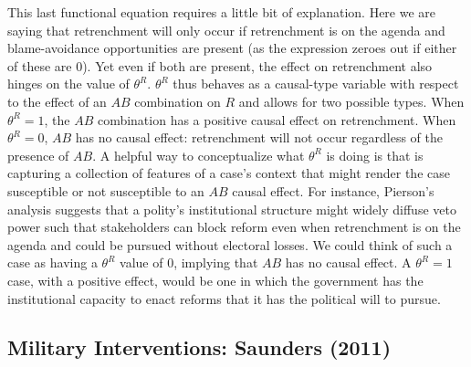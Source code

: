 \documentclass[
  12pt,
]{book}
\begin{document}
This last functional equation requires a little bit of explanation. Here we are saying that retrenchment will only occur if retrenchment is on the agenda and blame-avoidance opportunities are present (as the expression zeroes out if either of these are 0). Yet even if both are present, the effect on retrenchment also hinges on the value of \(\theta^R\). \(\theta^R\) thus behaves as a causal-type variable with respect to the effect of an \(AB\) combination on \(R\) and allows for two possible types. When \(\theta^R=1\), the \(AB\) combination has a positive causal effect on retrenchment. When \(\theta^R=0\), \(AB\) has no causal effect: retrenchment will not occur regardless of the presence of \(AB\). A helpful way to conceptualize what \(\theta^R\) is doing is that is capturing a collection of features of a case's context that might render the case susceptible or not susceptible to an \(AB\) causal effect. For instance, Pierson's analysis suggests that a polity's institutional structure might widely diffuse veto power such that stakeholders can block reform even when retrenchment is on the agenda and could be pursued without electoral losses. We could think of such a case as having a \(\theta^R\) value of 0, implying that \(AB\) has no causal effect. A \(\theta^R=1\) case, with a positive effect, would be one in which the government has the institutional capacity to enact reforms that it has the political will to pursue.

\hypertarget{military-interventions-saunders-2011}{%
\subsection{Military Interventions: Saunders (2011)}\label{military-interventions-saunders-2011}}
\end{document}
